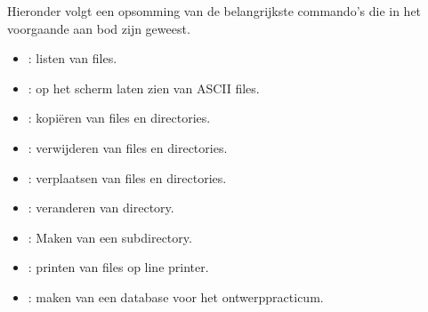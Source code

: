 Hieronder volgt een opsomming van de belangrijkste commando's die in het voorgaande aan bod zijn geweest.
\begin{itemize}
\item
{} : listen van files.
\item
{} : op het scherm laten zien van ASCII files.
\item
{} : kopi\"eren van files en directories.
\item
{} : verwijderen van files en directories.
\item
{} : verplaatsen van files en directories.
\item
{} : veranderen van directory.
\item
{} : Maken van een subdirectory.
\item
{} : printen van files op line printer.
\item
{} : maken van een database voor het ontwerppracticum.
\end{itemize}

\cleardoublepage
